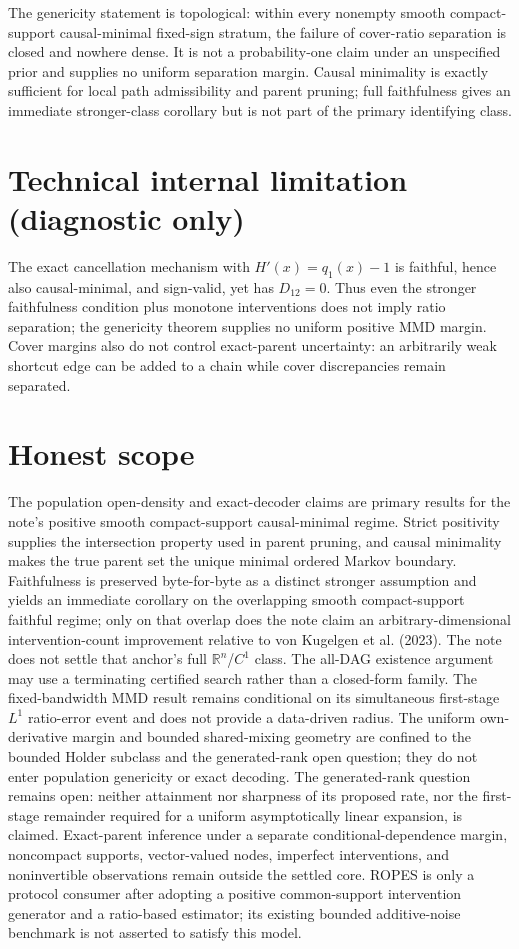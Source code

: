 \documentclass{article}
\begin{document}
The genericity statement is topological: within every nonempty smooth compact-support causal-minimal fixed-sign stratum, the failure of cover-ratio separation is closed and nowhere dense. It is not a probability-one claim under an unspecified prior and supplies no uniform separation margin. Causal minimality is exactly sufficient for local path admissibility and parent pruning; full faithfulness gives an immediate stronger-class corollary but is not part of the primary identifying class.

\section*{Technical internal limitation (diagnostic only)}

The exact cancellation mechanism with \(H'(x)=q_1(x)-1\) is faithful, hence also causal-minimal, and sign-valid, yet has \(D_{12}=0\). Thus even the stronger faithfulness condition plus monotone interventions does not imply ratio separation; the genericity theorem supplies no uniform positive MMD margin. Cover margins also do not control exact-parent uncertainty: an arbitrarily weak shortcut edge can be added to a chain while cover discrepancies remain separated.

\section{Honest scope}

The population open-density and exact-decoder claims are primary results for the note's positive smooth compact-support causal-minimal regime. Strict positivity supplies the intersection property used in parent pruning, and causal minimality makes the true parent set the unique minimal ordered Markov boundary. Faithfulness is preserved byte-for-byte as a distinct stronger assumption and yields an immediate corollary on the overlapping smooth compact-support faithful regime; only on that overlap does the note claim an arbitrary-dimensional intervention-count improvement relative to von Kugelgen et al. (2023). The note does not settle that anchor's full \(\mathbb R^n\)/\(C^1\) class. The all-DAG existence argument may use a terminating certified search rather than a closed-form family. The fixed-bandwidth MMD result remains conditional on its simultaneous first-stage \(L^1\) ratio-error event and does not provide a data-driven radius. The uniform own-derivative margin and bounded shared-mixing geometry are confined to the bounded Holder subclass and the generated-rank open question; they do not enter population genericity or exact decoding. The generated-rank question remains open: neither attainment nor sharpness of its proposed rate, nor the first-stage remainder required for a uniform asymptotically linear expansion, is claimed. Exact-parent inference under a separate conditional-dependence margin, noncompact supports, vector-valued nodes, imperfect interventions, and noninvertible observations remain outside the settled core. ROPES is only a protocol consumer after adopting a positive common-support intervention generator and a ratio-based estimator; its existing bounded additive-noise benchmark is not asserted to satisfy this model.
\end{document}
